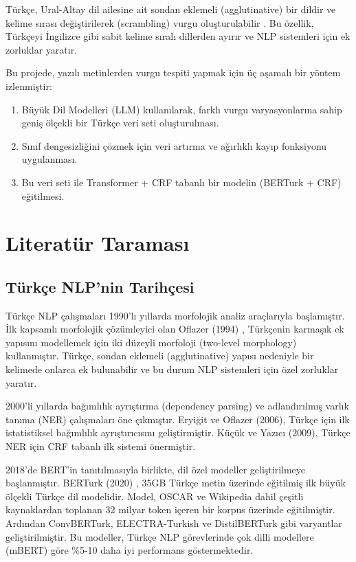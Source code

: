 \documentclass[conference]{IEEEtran}
\begin{document}
Türkçe, Ural-Altay dil ailesine ait sondan eklemeli (agglutinative) bir dildir ve kelime sırası değiştirilerek (scrambling) vurgu oluşturulabilir \cite{prosody1}. Bu özellik, Türkçeyi İngilizce gibi sabit kelime sıralı dillerden ayırır ve NLP sistemleri için ek zorluklar yaratır.

Bu projede, yazılı metinlerden vurgu tespiti yapmak için üç aşamalı bir yöntem izlenmiştir:
\begin{enumerate}
    \item Büyük Dil Modelleri (LLM) kullanılarak, farklı vurgu varyasyonlarına sahip geniş ölçekli bir Türkçe veri seti oluşturulması.
    \item Sınıf dengesizliğini çözmek için veri artırma ve ağırlıklı kayıp fonksiyonu uygulanması.
    \item Bu veri seti ile Transformer + CRF tabanlı bir modelin (BERTurk + CRF) eğitilmesi.
\end{enumerate}

\section{Literatür Taraması}

\subsection{Türkçe NLP'nin Tarihçesi}
Türkçe NLP çalışmaları 1990'lı yıllarda morfolojik analiz araçlarıyla başlamıştır. İlk kapsamlı morfolojik çözümleyici olan Oflazer (1994) \cite{oflazer1994}, Türkçenin karmaşık ek yapısını modellemek için iki düzeyli morfoloji (two-level morphology) kullanmıştır. Türkçe, sondan eklemeli (agglutinative) yapısı nedeniyle bir kelimede onlarca ek bulunabilir ve bu durum NLP sistemleri için özel zorluklar yaratır.

2000'li yıllarda bağımlılık ayrıştırma (dependency parsing) ve adlandırılmış varlık tanıma (NER) çalışmaları öne çıkmıştır. Eryiğit ve Oflazer (2006), Türkçe için ilk istatistiksel bağımlılık ayrıştırıcısını geliştirmiştir. Küçük ve Yazıcı (2009), Türkçe NER için CRF tabanlı ilk sistemi önermiştir.

2018'de BERT'in tanıtılmasıyla birlikte, dil özel modeller geliştirilmeye başlanmıştır. BERTurk (2020) \cite{stefanit}, 35GB Türkçe metin üzerinde eğitilmiş ilk büyük ölçekli Türkçe dil modelidir. Model, OSCAR ve Wikipedia dahil çeşitli kaynaklardan toplanan 32 milyar token içeren bir korpus üzerinde eğitilmiştir. Ardından ConvBERTurk, ELECTRA-Turkish ve DistilBERTurk gibi varyantlar geliştirilmiştir. Bu modeller, Türkçe NLP görevlerinde çok dilli modellere (mBERT) göre \%5-10 daha iyi performans göstermektedir.
\end{document}
